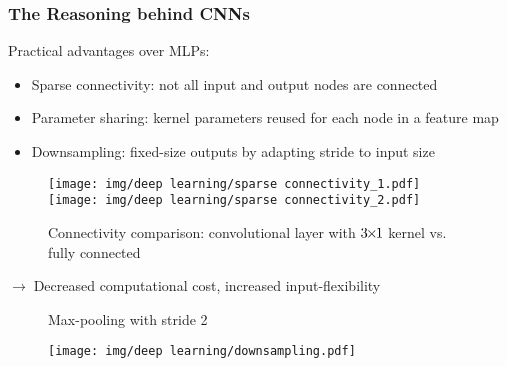 \documentclass{beamer}
\newcommand{\arrow}{$\rightarrow\;$}
\newcommand{\PLH}{{\mkern-2mu\times\mkern-2mu}}
\begin{document}
\begin{frame}
    \frametitle{The Reasoning behind CNNs}
    \hspace{-1em}
    \begin{minipage}{0.6\textwidth}
        Practical advantages over MLPs:
        \begin{itemize}
            \item Sparse connectivity: not all input and output nodes are connected
            \item Parameter sharing: kernel parameters reused for each node in a feature map
            \item Downsampling: fixed-size outputs by adapting stride to input size
        \end{itemize}
    \end{minipage}
    \hspace{0.5em}
    \begin{minipage}{0.35\textwidth}
        \vspace{-3em}
        \begin{figure}
            \texttt{[image: img/deep learning/sparse connectivity\_1.pdf]}
            \texttt{[image: img/deep learning/sparse connectivity\_2.pdf]}
            \hspace{-3em}
            \caption{Connectivity comparison: convolutional layer with $3\PLH1$ kernel vs. fully connected \cite{textbook}}
        \end{figure}
    \end{minipage}

    \arrow Decreased computational cost, increased input-flexibility\\
    \vspace{2em}
    
    \begin{minipage}[b]{0.5\textwidth}
        \begin{figure}
            \caption{Max-pooling with stride 2 \cite{textbook}}
        \end{figure}
    \end{minipage}
    \begin{minipage}[b]{0.45\textwidth}
        \begin{figure}
            \texttt{[image: img/deep learning/downsampling.pdf]}
            \hspace{-3em}
        \end{figure}
    \end{minipage}
    
\end{frame}
\end{document}
